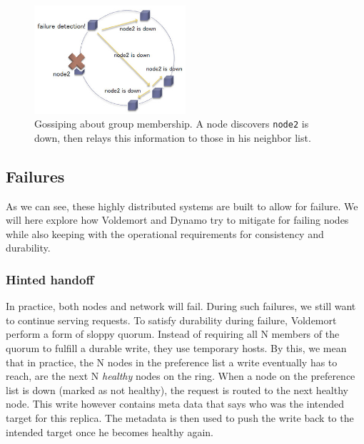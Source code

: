 \begin{itemize}
\begin{figure}[h]
    \centering
    \includegraphics[width=0.5\textwidth]{background/figures/gossip}
    \caption{Gossiping about group membership. A node discovers \texttt{node2} is down, then relays this information to those in his neighbor list.}
    \label{fig:gossip}
\end{figure}


\end{itemize}

\subsection{Failures}
\label{sec:failures}
As we can see, these highly distributed systems are built to allow for failure. We will here explore how Voldemort and Dynamo try to mitigate for failing nodes while also keeping with the operational requirements for consistency and durability. 

\subsubsection{Hinted handoff}
In practice, both nodes and network will fail. During such failures, we still want to continue serving requests.
To satisfy durability during failure, Voldemort perform a form of sloppy quorum. 
Instead of requiring all N members of the quorum to fulfill a durable write, they use temporary hosts. 
By this, we mean that in practice, the N nodes in the preference list a write eventually has to reach, are the next N \emph{healthy} nodes on the ring.
When a node on the preference list is down (marked as not healthy), the request is routed to the next healthy node. 
This write however contains meta data that says who was the intended target for this replica. 
The metadata is then used to push the write back to the intended target once he becomes healthy again.

